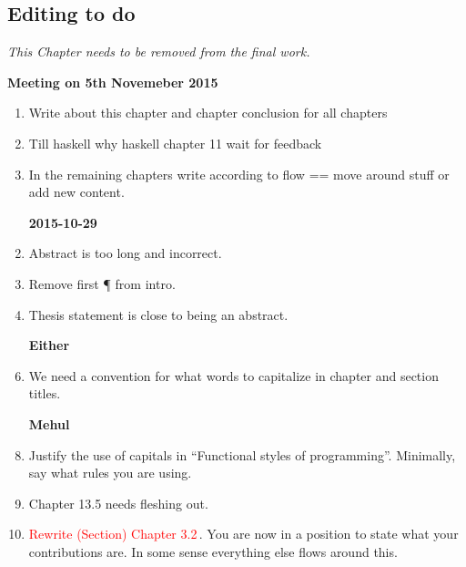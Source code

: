 
\begin{scope}
\nolinenumbers
\chapter{Editing to do}\label{chap:to-do}

\textit{\color{red} This Chapter needs to be removed from the final
  work.}

\textbf{Meeting on 5th Novemeber 2015} 
\begin{enumerate}
\item Write about this chapter and chapter conclusion for all chapters

\item Till haskell why haskell chapter 11 wait for feedback

\item In the remaining chapters write according to flow == move around stuff or add new content.
\end{enumerate}

\begin{enumerate}
\item [\textbf{2015-10-29}]
\item Abstract is too long and incorrect.
\item Remove first \P{} from intro.
\item Thesis statement is close to being an abstract.

\item [\textbf{Either}]
\item
  We need a convention for what words to capitalize in chapter and
  section titles.

\item [\textbf{Mehul}]

\item
  Justify the use of capitals in ``Functional styles of programming''.
  Minimally, say what rules you are using.
\item
  Chapter 13.5 needs fleshing out.

\item
  \textcolor{red}{Rewrite (Section) Chapter 3.2}\,.
  You are now in a position to state what your contributions are.
  In some sense everything else flows around this.


\end{enumerate}
\end{scope}
